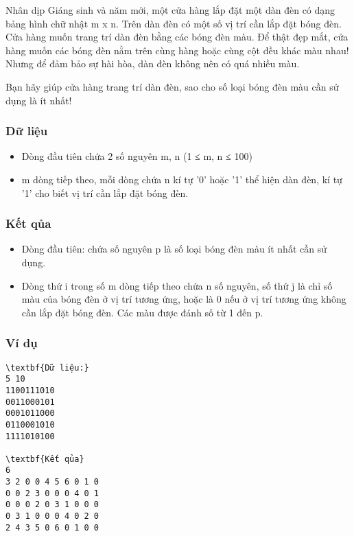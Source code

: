 



   Nhân dịp Giáng sinh và năm mới, một cửa hàng lắp đặt một dàn đèn có dạng bảng hình chữ nhật m x n. Trên dàn đèn có một số vị trí cần lắp đặt   bóng đèn. Cửa hàng muốn trang trí dàn đèn bằng các bóng đèn màu. Để thật đẹp mắt, cửa hàng muốn các bóng đèn nằm trên cùng hàng hoặc cùng cột   đều khác màu nhau! Nhưng để đảm bảo sự hài hòa, dàn đèn không nên có quá nhiều màu.  

   Bạn hãy giúp cửa hàng trang trí dàn đèn, sao cho số loại bóng đèn màu cần sử dụng là ít nhất!  

\subsubsection{   Dữ liệu  }
\begin{itemize}
	\item     Dòng đầu tiên chứa 2 số nguyên m, n (1 ≤ m, n ≤ 100)   
	\item     m dòng tiếp theo, mỗi dòng chứa n kí tự '0' hoặc '1' thể hiện dàn đèn, kí tự '1' cho biết vị trí cần lắp đặt bóng đèn.   
\end{itemize}

\subsubsection{   Kết qủa  }
\begin{itemize}
	\item     Dòng đầu tiên: chứa số nguyên p là số loại bóng đèn màu ít nhất cần sử dụng.   
	\item     Dòng thứ i trong số m dòng tiếp theo chứa n số nguyên, số thứ j là chỉ số màu của bóng đèn ở vị trí tương ứng, hoặc là 0 nếu ở vị trí tương ứng   không cần lắp đặt bóng đèn. Các màu được đánh số từ 1 đến p.   
\end{itemize}

\subsubsection{   Ví dụ  }
\begin{verbatim}
\textbf{Dữ liệu:}
5 10
1100111010 
0011000101 
0001011000 
0110001010 
1111010100

\textbf{Kết qủa}
6
3 2 0 0 4 5 6 0 1 0 
0 0 2 3 0 0 0 4 0 1 
0 0 0 2 0 3 1 0 0 0 
0 3 1 0 0 0 4 0 2 0 
2 4 3 5 0 6 0 1 0 0
\end{verbatim}